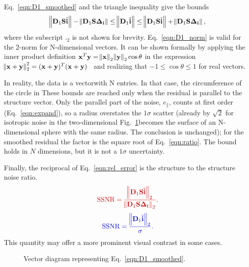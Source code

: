 \documentclass[twocolumn]{aastex631}
\providecommand{\DIFadd}[1]{{\protect\color{BLUE}#1}} %
\providecommand{\DIFdel}[1]{{\protect\color{RED}#1}} %
\providecommand{\DIFaddbegin}{} \providecommand{\DIFaddend}{} %
\providecommand{\DIFdelbegin}{} \providecommand{\DIFdelend}{} %
\newcommand{\DIFscaledelfig}{0.5}
\newlength{\DIFdelgraphicswidth} %
\newlength{\DIFdelgraphicsheight} %
\newcommand{\DIFaddincludegraphics}[2][]{{\color{blue}\fbox{\DIFOincludegraphics[#1]{#2}}}} %
\newcommand{\DIFdelincludegraphics}[2][]{%
\sbox{\DIFdelgraphicsbox}{\DIFOincludegraphics[#1]{#2}}%
\settoboxwidth{\DIFdelgraphicswidth}{\DIFdelgraphicsbox} %
\settoboxtotalheight{\DIFdelgraphicsheight}{\DIFdelgraphicsbox} %
\scalebox{\DIFscaledelfig}{%
\parbox[b]{\DIFdelgraphicswidth}{\usebox{\DIFdelgraphicsbox}\\[-\baselineskip] \rule{\DIFdelgraphicswidth}{0em}}\llap{\resizebox{\DIFdelgraphicswidth}{\DIFdelgraphicsheight}{%
\setlength{\unitlength}{\DIFdelgraphicswidth}%
\begin{picture}(1,1)%
\thicklines\linethickness{2pt} %
{\color[rgb]{1,0,0}\put(0,0){\framebox(1,1){}}}%
{\color[rgb]{1,0,0}\put(0,0){\line( 1,1){1}}}%
{\color[rgb]{1,0,0}\put(0,1){\line(1,-1){1}}}%
\end{picture}%
}\hspace*{3pt}}} %
} %
\DeclareRobustCommand{\DIFaddbegin}{\DIFOaddbegin \let\includegraphics\DIFaddincludegraphics} %
\DeclareRobustCommand{\DIFaddend}{\DIFOaddend \let\includegraphics\DIFOincludegraphics} %
\DeclareRobustCommand{\DIFdelbegin}{\DIFOdelbegin \let\includegraphics\DIFdelincludegraphics} %
\DeclareRobustCommand{\DIFdelend}{\DIFOaddend \let\includegraphics\DIFOincludegraphics} %
\begin{document}
\DIFadd{Eq.~\eqref{eqn:D1_smoothed} and the triangle inequality give the bounds 
}\DIFaddend \begin{eqnarray}
\norm{\mathbf{D}_1\mathbf{S}\tilde{\mathbf{i}}}-\norm{\mathbf{D}_1\mathbf{S}\mathbf{\Delta_i}}\leq\norm{\mathbf{D}_1\tilde{\mathbf{i}}}\leq\norm{\mathbf{D}_1\mathbf{S}\tilde{\mathbf{i}}}+\norm{\mathbf{D}_1\mathbf{S}\mathbf{\Delta_i}},
\label{eqn:D1_norm}
\end{eqnarray}
where the subscript $._2$ is not shown for brevity. Eq.~\eqref{eqn:D1_norm} is valid for the 2-norm for N-dimensional vectors. It can be shown formally by applying the inner product definition $\mathbf{x}^T\mathbf{y}=\norm{\mathbf{x}}_2\norm{\mathbf{y}}_2  \cos\theta$ in the expression $\norm{\mathbf{x} + \mathbf{y}}_2^2=(\mathbf{x} + \mathbf{y})^T(\mathbf{x} + \mathbf{y})$~\citep[see Ch.~1]{Strang_LALD2019} and realizing that $-1\leq \cos\theta \leq 1$ for real vectors. 

\DIFdelbegin \DIFdel{In reality, the data is a vectorwith N entries. In that case, the circumference of the circle in }\DIFdelend \DIFaddbegin \DIFadd{These bounds are reached only when the residual is parallel to the structure vector. Only the parallel part of the noise, $e_\parallel$, counts at first order (Eq.~\ref{eqn:expand}), so a radius overstates the $1\sigma$ scatter (already by $\sqrt{2}$ for isotropic noise in the two-dimensional }\DIFaddend Fig.~\ref{fig:vec_sum}\DIFdelbegin \DIFdel{becomes the surface of an N-dimensional sphere with the same radius. The conclusion is unchanged}\DIFdelend \DIFaddbegin \DIFadd{); for the smoothed residual the factor is the square root of Eq.~\eqref{eqn:ratio}. The bound holds in $N$ dimensions, but it is not a $1\sigma$ uncertainty}\DIFaddend .

Finally, the reciprocal of Eq.~\eqref{eqn:rel_error} is the structure to the structure noise ratio.
\DIFdelbegin \begin{eqnarray*}
\DIFdel{\text{SSNR}=\frac{\norm{\mathbf{D}_1\mathbf{S}\tilde{\mathbf{i}}}_2}{\norm{\mathbf{D}_1\mathbf{S}\mathbf{\Delta_i}}_2}.
}\end{eqnarray*}%
\DIFdelend \DIFaddbegin \begin{eqnarray}
\DIFadd{\text{SSNR}=\frac{\norm{\mathbf{D}_1\tilde{\mathbf{i}}}_2}{\sigma}.
\label{eqn:SSNR}
}\end{eqnarray}\DIFaddend 
This quantity may offer a more prominent visual contrast in some cases. 

\begin{figure}
    \centering
    \caption{Vector diagram representing Eq.~\eqref{eqn:D1_smoothed}.}
    \label{fig:vec_sum}
\end{figure}
\end{document}
